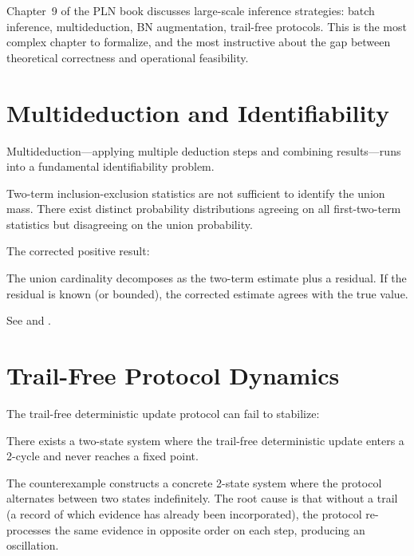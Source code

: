 \documentclass[11pt,openany]{report}
\begin{document}
Chapter~9 of the PLN book discusses large-scale inference strategies:
batch inference, multideduction, BN augmentation, trail-free protocols.
This is the most complex chapter to formalize, and the most instructive
about the gap between theoretical correctness and operational feasibility.

\section{Multideduction and Identifiability}

Multideduction---applying multiple deduction steps and combining
results---runs into a fundamental identifiability problem.

\boundarystart
\begin{theorem}
Two-term inclusion-exclusion statistics are not sufficient to identify the
union mass.  There exist distinct probability distributions agreeing on all
first-two-term statistics but disagreeing on the union probability.
\end{theorem}
\boundaryend

The corrected positive result:

\begin{theorem}
The union cardinality decomposes as the two-term estimate plus a residual.
If the residual is known (or bounded), the corrected estimate agrees with
the true value.
\end{theorem}

See  and
.

\section{Trail-Free Protocol Dynamics}

The trail-free deterministic update protocol can fail to stabilize:

\begin{theorem}
There exists a two-state system where the trail-free deterministic update
enters a 2-cycle and never reaches a fixed point.
\end{theorem}

\noindent
The counterexample constructs a concrete 2-state system where the protocol
alternates between two states indefinitely.  The root cause is that
without a trail (a record of which evidence has already been incorporated),
the protocol re-processes the same evidence in opposite order on each step,
producing an oscillation.
\end{document}
